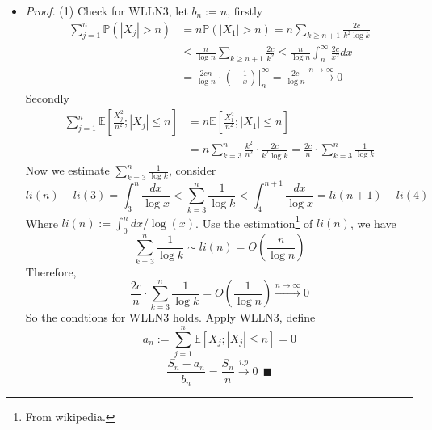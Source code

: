 \documentclass[a4paper,12pt,twoside]{book}
\begin{document}
\begin{itemize}
	\item[]\textit{Proof.} (1) Check for WLLN3, let $b_n:=n$, firstly
	\begin{equation}
		\begin{split}
			\sum_{j=1}^n \mathbb{P}\left(|X_j|>n\right)&=n \mathbb{P}\left(|X_1|> n\right)=n\sum_{k\geq n+1}\frac{2c}{k^2\log k}\\
			&\leq \frac{n}{\log n}\sum_{k\geq n+1}\frac{2c}{k^2}\leq \frac{n}{\log n}\int_n^{\infty}\frac{2c}{x^2}dx\\
			&=\frac{2cn}{\log n}\cdot \left.(-\frac{1}{x})\right\vert_n^{\infty}=\frac{2c}{\log n} \xrightarrow{n\to \infty}0
		\end{split}
	\end{equation}
	Secondly
	\begin{equation}
		\begin{split}
			\sum_{j=1}^n \mathbb{E}\left[\frac{X_j^2}{n^2};|X_j|\leq n\right]&=n \mathbb{E}\left[\frac{X_1^2}{n^2};|X_1|\leq n\right]\\
			&=n \sum_{k=3}^n\frac{k^2}{n^2}\cdot \frac{2c}{k^2\log k}=\frac{2c}{n}\cdot \sum_{k=3}^n\frac{1}{\log k}
		\end{split}
	\end{equation}
	Now we estimate $\sum_{k=3}^n\frac{1}{\log k}$, consider
	\begin{equation}
		li(n)-li(3)=\int_{3}^n \frac{dx}{\log x}<\sum_{k=3}^n\frac{1}{\log k}<\int_4^{n+1} \frac{dx}{\log x} = li(n+1)-li(4)
	\end{equation}
	Where $li(n):=\int_0^n dx/\log(x)$. Use the estimation\footnote{From wikipedia.} of $li(n)$, we have
	\begin{equation}
		\sum_{k=3}^n\frac{1}{\log k} \sim li(n)=O\left(\frac{n}{\log n}\right)
	\end{equation}
	Therefore,
	\begin{equation}
		\frac{2c}{n}\cdot \sum_{k=3}^n\frac{1}{\log k} = O\left(\frac{1}{\log n}\right) \xrightarrow{n\to \infty} 0
	\end{equation}
	So the condtions for WLLN3 holds. Apply WLLN3, define
	\begin{equation}
		a_n := \sum_{j=1}^n \mathbb{E}\left[X_j; |X_j|\leq n\right] = 0
	\end{equation}
	\begin{equation}
		\frac{S_n - a_n}{b_n}=\frac{S_n}{n} \xrightarrow{i.p} 0~~\blacksquare
	\end{equation}


\end{itemize}
\end{document}
